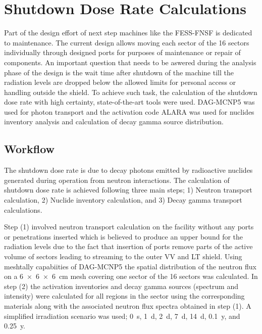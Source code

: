 \documentclass[12pt, letterpaper]{elsarticle}
\begin{document}
\section{Shutdown Dose Rate Calculations} \label{Shutdown Dose Rate Calculations}
Part of the design effort of next step machines like the FESS-FNSF is dedicated to maintenance. The current design allows moving each sector of the 16 sectors individually through designed ports for purposes of maintenance or repair of components. An important question that needs to be aswered during the analysis phase of the design is the wait time after shutdown of the machine till the radiation levels are dropped below the allowed limits for personal access or handling outside the shield. To achieve such task, the calculation of the shutdown dose rate with high certainty, state-of-the-art tools were used. DAG-MCNP5 was used for photon transport and the activation code ALARA was used for nuclides inventory analysis and calculation of decay gamma source distribution.\vspace{5mm}   

\subsection{Workflow} \label{SDR_workflow}
The shutdown dose rate is due to decay photons emitted by radioactive nuclides generated during operation from neutron interactions. The calculation of shutdown dose rate is achieved following three main steps; 1) Neutron transport calculation, 2) Nuclide inventory calculation, and 3) Decay gamma transport calculations.\vspace{5mm}

Step (1) involved neutron transport calculation on the facility without any ports or penetrations inserted which is believed to produce an upper bound for the radiation levels due to the fact that insertion of ports remove parts of the active volume of sectors leading to streaming to the outer VV and LT shield. Using meshtally capabiities of DAG-MCNP5 the spatial distribution of the neutron flux on a \SI{6x6x6}{cm} mesh covering one sector of the 16 sectors was calculated. In step (2) the activation inventories and decay gamma sources (spectrum and intensity) were calculated for all regions in the sector using the corresponding materials along with the associated neutron flux spectra obtained in step (1). A simplified irradiation scenario was used; \SI{0}{s}, \SI{1}{d}, \SI{2}{d}, \SI{7}{d}, \SI{14}{d}, \SI{0.1}{y}, and \SI{0.25}{y}.\vspace{5mm}
\end{document}
